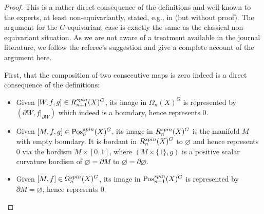 \documentclass[10pt,a4paper]{amsart}
\newcommand{\boundary}[1]{\partial#1}
\begin{document}
	\begin{proof}
		This is a rather direct consequence of the definitions and well known to the
		experts, at least non-equivariantly, stated, e.g., in \cite[long exact sequence~(4.4)]{Stolz} (but
		without proof). The
		argument for the
		$G$-equivariant case is exactly the same as the classical non-equivariant
		situation. As we are not aware of a treatment available in the journal
		literature, we follow the referee's suggestion and give a complete account
		of the argument here.
		
		First, that the composition of two consecutive maps is zero indeed is a
		direct consequence of the definitions:
		\begin{itemize}\itemsep=0pt
			\item Given $[W,f,g]\in R^{\rm spin}_{n+1}(X)^G$, its image in $\Omega_n(X)^G$ is
			represented by $(\boundary W,f|_{\boundary W})$ which indeed is a boundary, hence represents
			$0$.
			\item Given $[M,f,g]\in \mathrm{Pos}_n^{\rm spin}(X)^G$, its image in $R^{\rm spin}_n(X)^G$ is
			the manifold $M$ with empty boundary. It is bordant in $R^{\rm spin}_n(X)^G$
			to $\varnothing$ and hence represents $0$ via the
			bordism $M\times [0,1]$, where $(M\times \{1\},g)$ is a positive scalar curvature bordism of
			$\varnothing =\boundary M$ to $\varnothing=\boundary\varnothing$.
			\item Given $[M,f]\in \Omega^{\rm spin}_n(X)^G$, its image in
			$\mathrm{Pos}_{n-1}^{\rm spin}(X)^G$ is represented by $\boundary M=\varnothing$, hence
			represents $0$.
		\end{itemize}
		

\end{proof}
\end{document}

